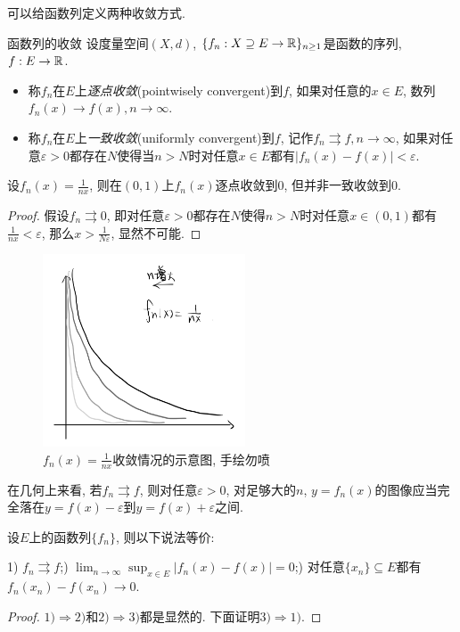 可以给函数列定义两种收敛方式. 

\begin{definition}{函数列的收敛}
	设度量空间$(X,d)$, $\{ f_n :X \supseteq E \to \mathbb{R} \}_{n\geq 1}$是函数的序列, $f:E \to \mathbb{R}$. 
	\begin{itemize}
		\item 称$f_n$在$E$上\textit{逐点收敛}(pointwisely convergent)到$f$, 如果对任意的$x \in E$, 数列$f_n(x) \to f(x),n \to \infty$. 
		\item 称$f_n$在$E$上\textit{一致收敛}(uniformly convergent)到$f$, 记作$f_n \rightrightarrows f,n\to \infty$, 如果对任意$\varepsilon >0$都存在$N$使得当$n>N$时对任意$x \in E$都有$|f_n(x)-f(x)|<\varepsilon$. 
	\end{itemize}
\end{definition}

\begin{example}
	设$f_n(x)=\frac{1}{nx}$, 则在$(0,1)$上$f_n(x)$逐点收敛到$0$, 但并非一致收敛到$0$. 
\end{example}
\begin{proof}
	假设$f_n \rightrightarrows 0$, 即对任意$\varepsilon >0$都存在$N$使得$n>N$时对任意$x \in (0,1)$都有$\frac{1}{nx}<\varepsilon$, 那么$x > \frac{1}{N\varepsilon}$, 显然不可能. 
\end{proof}

\begin{figure}[H]
	\centering
	\includegraphics[width=6cm]{attachment/IMG_3545.jpg}
	\caption{$f_n(x)=\frac{1}{nx}$收敛情况的示意图, 手绘勿喷}
\end{figure}

在几何上来看, 若$f_n \rightrightarrows f$, 则对任意$\varepsilon >0$, 对足够大的$n$, $y=f_n(x)$的图像应当完全落在$y=f(x)-\varepsilon$到$y=f(x)+\varepsilon$之间. 

\begin{proposition}{}
	设$E$上的函数列$\{ f_n \}$, 则以下说法等价: 
	
	1) $f_n \rightrightarrows f$;) $\displaystyle \lim_{n\to \infty} \sup_{x \in E}|f_n(x) - f(x)|=0$;) 对任意$\{ x_n \}\subseteq E$都有$f_n(x_n)-f(x_n) \to 0$. 
\end{proposition}
\begin{proof}
	$1) \Rightarrow 2)$和$2) \Rightarrow 3)$都是显然的. 下面证明$3) \Rightarrow 1)$. 
\end{proof}


